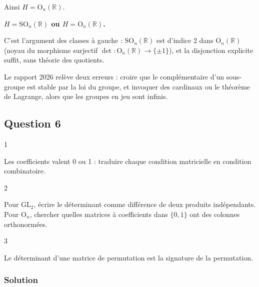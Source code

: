 \documentclass[11pt,a4paper]{article}
\begin{document}
Ainsi \(H={\mathrm{O}}_n(\mathbb{R})\).

\textbf{\(H={\mathrm{SO}}_n(\mathbb{R})\) ou \(H={\mathrm{O}}_n(\mathbb{R})\).}

\begin{methode}

C'est l'argument des classes à gauche : \({\mathrm{SO}}_n(\mathbb{R})\) est d'indice 2 dans \({\mathrm{O}}_n(\mathbb{R})\) (noyau du morphisme surjectif \(\det:{\mathrm{O}}_n(\mathbb{R})\to\{\pm1\}\)), et la disjonction explicite suffit, sans théorie des quotients.

\end{methode}

\begin{piege}

Le rapport 2026 relève deux erreurs : croire que le complémentaire d'un sous-groupe est stable par la loi du groupe, et invoquer des cardinaux ou le théorème de Lagrange, alors que les groupes en jeu sont infinis.

\end{piege}

\hypertarget{question-6}{%
\subsection{Question 6}\label{question-6}}

\begin{indication}{1}

Les coefficients valent 0 ou 1 : traduire chaque condition matricielle en condition combinatoire.

\end{indication}

\begin{indication}{2}

Pour \({\mathrm{GL}}_2\), écrire le déterminant comme différence de deux produits indépendants. Pour \({\mathrm{O}}_n\), chercher quelles matrices à coefficients dans \(\{0,1\}\) ont des colonnes orthonormées.

\end{indication}

\begin{indication}{3}

Le déterminant d'une matrice de permutation est la signature de la permutation.

\end{indication}

\hypertarget{solution-5}{%
\subsubsection{Solution}\label{solution-5}}
\end{document}
